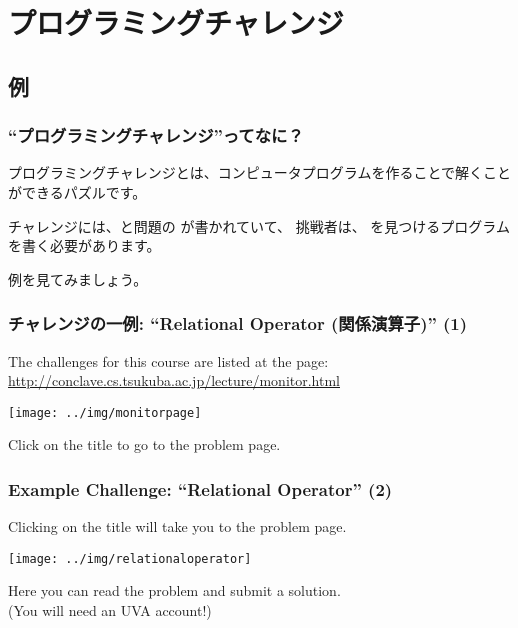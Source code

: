 \documentclass{beamer}
\begin{document}
\section{プログラミングチャレンジ}
\subsection{例}

\begin{frame}
  \frametitle{``プログラミングチャレンジ''ってなに？}

  プログラミングチャレンジとは、コンピュータプログラムを作ることで解くことができるパズルです。

  \bigskip

  チャレンジには、と問題の  が書かれていて、
  挑戦者は、 を見つけるプログラムを書く必要があります。

  \bigskip

  例を見てみましょう。
  
\end{frame}

\begin{frame}
  \frametitle{チャレンジの一例: ``Relational Operator (関係演算子)'' (1)}

  {\small
  The challenges for this course are listed at the page:\\
  {\smaller \url{http://conclave.cs.tsukuba.ac.jp/lecture/monitor.html}}

  \begin{center}
    \texttt{[image: ../img/monitorpage]}
  \end{center}

  Click on the title to go to the problem page.}
\end{frame}

\begin{frame}
  \frametitle{Example Challenge: ``Relational Operator'' (2)}

  Clicking on the title will take you to the problem page.
  
  \begin{center}
    \texttt{[image: ../img/relationaloperator]}
  \end{center}

  Here you can read the problem and submit a solution.\\
  (You will need an UVA account!)

\end{frame}
\end{document}
